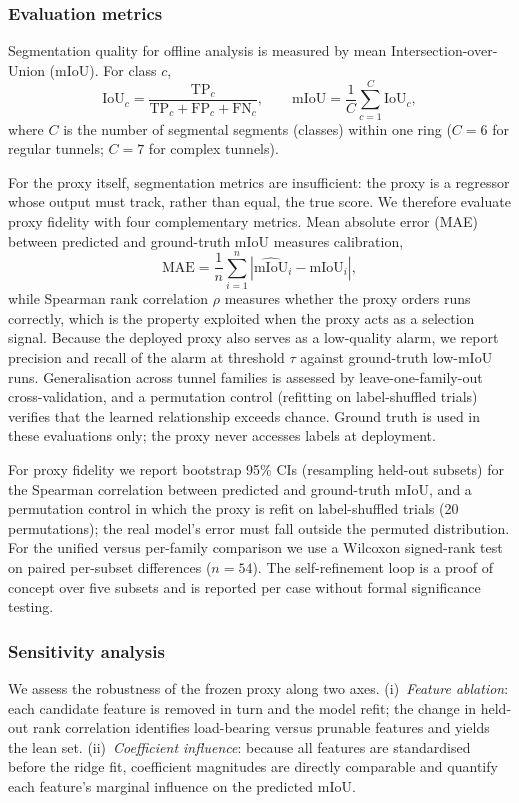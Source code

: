 \documentclass[a4paper,fleqn]{cas-dc}
\begin{document}
\subsubsection{Evaluation metrics}\label{sec:metrics}

Segmentation quality for offline analysis is measured by mean Intersection-over-Union (mIoU). For class $c$,
\begin{equation}
\text{IoU}_c = \frac{\text{TP}_c}{\text{TP}_c + \text{FP}_c + \text{FN}_c}, \qquad
\text{mIoU} = \frac{1}{C} \sum_{c=1}^{C} \text{IoU}_c,
\end{equation}
where $C$ is the number of segmental segments (classes) within one ring ($C=6$ for regular tunnels; $C=7$ for complex tunnels).

For the proxy itself, segmentation metrics are insufficient: the proxy is a
regressor whose output must track, rather than equal, the true score. We
therefore evaluate proxy fidelity with four complementary metrics. Mean
absolute error (MAE) between predicted and ground-truth mIoU measures
calibration,
\begin{equation}
\text{MAE} = \frac{1}{n}\sum_{i=1}^{n}\left|\widehat{\text{mIoU}}_i - \text{mIoU}_i\right|,
\end{equation}
while Spearman rank correlation $\rho$ measures whether the proxy orders runs
correctly, which is the property exploited when the proxy acts as a selection
signal. Because the deployed proxy also serves as a low-quality alarm, we
report precision and recall of the alarm at threshold $\tau$ against
ground-truth low-mIoU runs. Generalisation across tunnel families is assessed
by leave-one-family-out cross-validation, and a permutation control (refitting
on label-shuffled trials) verifies that the learned relationship exceeds
chance. Ground truth is used in these evaluations only; the proxy never
accesses labels at deployment.

For proxy fidelity we report bootstrap 95\% CIs (resampling held-out subsets)
for the Spearman correlation between predicted and ground-truth mIoU, and a
permutation control in which the proxy is refit on label-shuffled trials
(20 permutations); the real model's error must fall outside the permuted
distribution. For the unified versus per-family comparison we use a Wilcoxon
signed-rank test on paired per-subset differences ($n=54$). The
self-refinement loop is a proof of concept over five subsets and is reported
per case without formal significance testing.

\subsubsection{Sensitivity analysis}\label{sec:sensitivity-method}
We assess the robustness of the frozen proxy along two axes.
(i)~\emph{Feature ablation}: each candidate feature is removed in turn and the
model refit; the change in held-out rank correlation identifies load-bearing
versus prunable features and yields the lean set.
(ii)~\emph{Coefficient influence}: because all features are standardised
before the ridge fit, coefficient magnitudes are directly comparable and
quantify each feature's marginal influence on the predicted mIoU.
\end{document}
